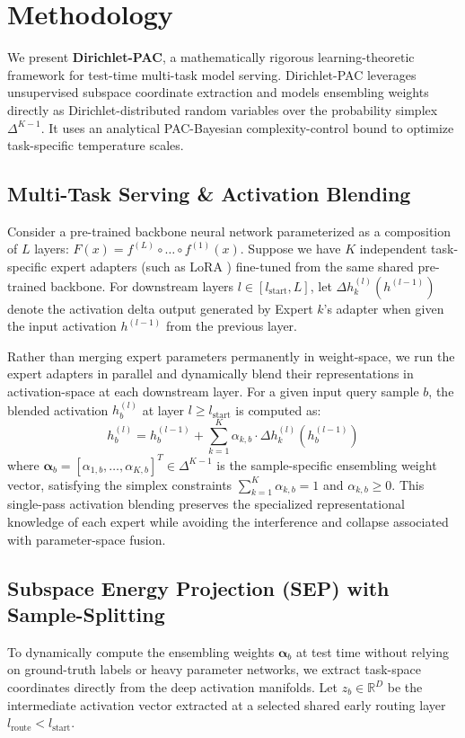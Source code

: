\section{Methodology}
\label{sec:method}

We present \textbf{Dirichlet-PAC}, a mathematically rigorous learning-theoretic framework for test-time multi-task model serving. Dirichlet-PAC leverages unsupervised subspace coordinate extraction and models ensembling weights directly as Dirichlet-distributed random variables over the probability simplex $\Delta^{K-1}$. It uses an analytical PAC-Bayesian complexity-control bound to optimize task-specific temperature scales.

\subsection{Multi-Task Serving \& Activation Blending}
Consider a pre-trained backbone neural network parameterized as a composition of $L$ layers: $F(x) = f^{(L)} \circ \dots \circ f^{(1)}(x)$. Suppose we have $K$ independent task-specific expert adapters (such as LoRA \cite{hu2021lora}) fine-tuned from the same shared pre-trained backbone. For downstream layers $l \in [l_{\text{start}}, L]$, let $\Delta h_k^{(l)}(h^{(l-1)})$ denote the activation delta output generated by Expert $k$'s adapter when given the input activation $h^{(l-1)}$ from the previous layer.

Rather than merging expert parameters permanently in weight-space, we run the expert adapters in parallel and dynamically blend their representations in activation-space at each downstream layer. For a given input query sample $b$, the blended activation $h_b^{(l)}$ at layer $l \ge l_{\text{start}}$ is computed as:
\begin{equation}
  h_b^{(l)} = h_b^{(l-1)} + \sum_{k=1}^K \alpha_{k, b} \cdot \Delta h_k^{(l)}\left(h_b^{(l-1)}\right)
  \label{eq:blending}
\end{equation}
where $\boldsymbol{\alpha}_b = [\alpha_{1, b}, \dots, \alpha_{K, b}]^T \in \Delta^{K-1}$ is the sample-specific ensembling weight vector, satisfying the simplex constraints $\sum_{k=1}^K \alpha_{k, b} = 1$ and $\alpha_{k, b} \ge 0$. This single-pass activation blending preserves the specialized representational knowledge of each expert while avoiding the interference and collapse associated with parameter-space fusion.

\subsection{Subspace Energy Projection (SEP) with Sample-Splitting}
To dynamically compute the ensembling weights $\boldsymbol{\alpha}_b$ at test time without relying on ground-truth labels or heavy parameter networks, we extract task-space coordinates directly from the deep activation manifolds. Let $z_b \in \mathbb{R}^D$ be the intermediate activation vector extracted at a selected shared early routing layer $l_{\text{route}} < l_{\text{start}}$.

